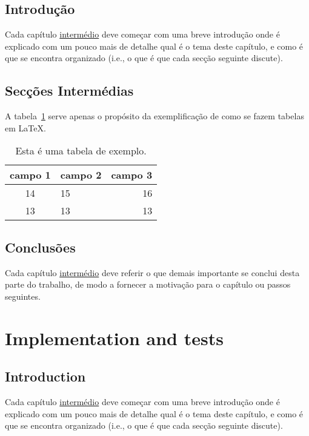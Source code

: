 \documentclass[titlepage,12pt,a4paper,times]{book}
\begin{document}
\section{Introdução}
\label{chap3:sec:intro}
Cada capítulo \underline{intermédio} deve começar com uma breve introdução onde
é explicado com um pouco mais de detalhe qual é o tema deste capítulo, e como é
que se encontra organizado (i.e., o que é que cada secção seguinte discute).

\section{Secções Intermédias}
\label{chap3:sec:...}

A tabela~\ref{tab:exemplo} serve apenas o propósito da exemplificação de como
se fazem tabelas em \LaTeX.
%
\begin{table}
\centering
\begin{tabular}{|c|lr|}
\hline
\textbf{campo 1} & \textbf{campo 2} & \textbf{campo 3}\\
\hline
\hline
14 & 15 & 16 \\
\hline
13 & 13 & 13 \\
\hline
\end{tabular}
\caption{Esta é uma tabela de exemplo.}
\label{tab:exemplo}
\end{table}

\section{Conclusões}
\label{chap3:sec:concs}
Cada capítulo \underline{intermédio} deve referir o que demais importante se
conclui desta parte do trabalho, de modo a fornecer a motivação para o capítulo
ou passos seguintes.

\chapter{Implementation and tests}
\label{chap:imp-test}

\section{Introduction}
\label{chap4:sec:intro}
Cada capítulo \underline{intermédio} deve começar com uma breve introdução onde
é explicado com um pouco mais de detalhe qual é o tema deste capítulo, e como é
que se encontra organizado (i.e., o que é que cada secção seguinte discute).
\end{document}

